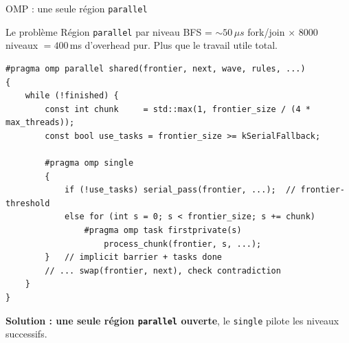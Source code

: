 \documentclass[aspectratio=169,11pt]{beamer}
\begin{document}
\begin{frame}[fragile]{OMP : une seule région \texttt{parallel}}
\begin{block}{Le problème}
Région \texttt{parallel} par niveau BFS = $\sim 50\,\mu s$ fork/join $\times$ 8000 niveaux $= 400\,$ms d'overhead pur. Plus que le travail utile total.
\end{block}

\begin{lstlisting}
#pragma omp parallel shared(frontier, next, wave, rules, ...)
{
    while (!finished) {
        const int chunk     = std::max(1, frontier_size / (4 * max_threads));
        const bool use_tasks = frontier_size >= kSerialFallback;

        #pragma omp single
        {
            if (!use_tasks) serial_pass(frontier, ...);  // frontier-threshold
            else for (int s = 0; s < frontier_size; s += chunk)
                #pragma omp task firstprivate(s)
                    process_chunk(frontier, s, ...);
        }   // implicit barrier + tasks done
        // ... swap(frontier, next), check contradiction
    }
}
\end{lstlisting}

\textbf{Solution : une seule région \texttt{parallel} ouverte}, le \texttt{single} pilote les niveaux successifs.
\end{frame}
\end{document}
